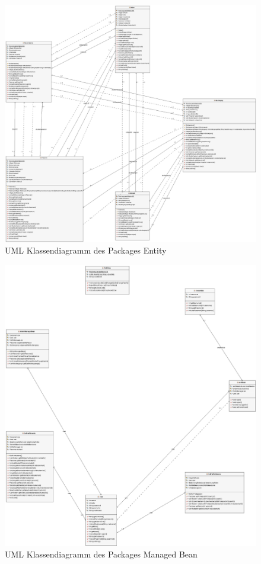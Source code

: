\documentclass[12pt,a4paper,parskip]{scrreprt}
\begin{document}
\begin{figure}[h]
	\centering
	\includegraphics[width=1\linewidth]{Diagramme/generated/package_entity}
	\caption[Package Entity]{UML Klassendiagramm des Packages \glqq Entity\grqq}
	\label{fig:package_entity}
\end{figure}
\begin{figure}[h]
	\centering
	\includegraphics[width=1\linewidth]{Diagramme/generated/package_managedBean}
	\caption[Package Managed Bean]{UML Klassendiagramm des Packages \glqq Managed Bean\grqq}
	\label{fig:package_managed_bean}
\end{figure}
\end{document}
